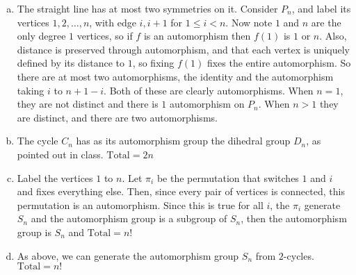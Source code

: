 \begin{enumerate}[(a)]
\item The straight line has at most two symmetries on it.
Consider $P_n$, and label its vertices $1,2,\dots, n$, with edge $i,i+1$
for $1 \le i < n$. Now note $1$ and $n$ are the only degree $1$ vertices, so
if $f$ is an automorphism then $f(1)$ is $1$ or $n$. Also, distance
is preserved through automorphism, and that each vertex is uniquely defined by
its distance to $1$, so fixing $f(1)$ fixes the entire automorphism. So there
are at most two automorphisms, the identity and the automorphism taking $i$ to
$n+1-i$. Both of these are clearly automorphisms. When $n=1$, they are not
distinct and there is $1$ automorphism on $P_n$. When $n>1$ they are distinct,
and there are two automorphisms.
\item The cycle $C_n$ has as its automorphism group the dihedral group 
$D_n$, as pointed out in class. $\text{Total} = 2n$
\item Label the vertices $1$ to $n$. Let $\pi_i$ be the permutation
that switches $1$ and $i$ and fixes everything else. Then, since every pair of
vertices is connected, this permutation is an automorphism. Since this is true
for all $i$, the $\pi_i$ generate $S_n$ and the automorphism group is a subgroup
of $S_n$, then the automorphism group is $S_n$
and $\text{Total}=n!$
\item As above, we can generate the automorphism group $S_n$ from 
$2$-cycles. $\text{Total} = n!$
\end{enumerate}
